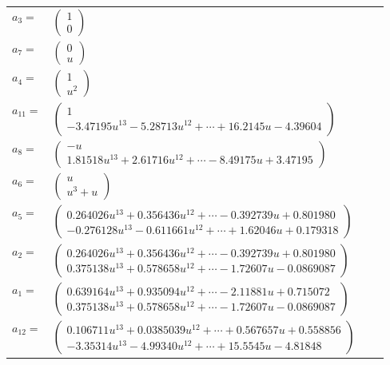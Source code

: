 \documentclass[1p]{elsarticle_modified}
\theoremstyle{definition}
\begin{document}
\begin{tabular}{m{7pt} m{180pt} m{7pt} m{180pt} }
\flushright $a_{3}=$&$\begin{pmatrix}1\\0\end{pmatrix}$ \\
\flushright $a_{7}=$&$\begin{pmatrix}0\\u\end{pmatrix}$ \\
\flushright $a_{4}=$&$\begin{pmatrix}1\\u^2\end{pmatrix}$ \\
\flushright $a_{11}=$&$\begin{pmatrix}1\\-3.47195 u^{13}-5.28713 u^{12}+\cdots+16.2145 u-4.39604\end{pmatrix}$ \\
\flushright $a_{8}=$&$\begin{pmatrix}- u\\1.81518 u^{13}+2.61716 u^{12}+\cdots-8.49175 u+3.47195\end{pmatrix}$ \\
\flushright $a_{6}=$&$\begin{pmatrix}u\\u^3+u\end{pmatrix}$ \\
\flushright $a_{5}=$&$\begin{pmatrix}0.264026 u^{13}+0.356436 u^{12}+\cdots-0.392739 u+0.801980\\-0.276128 u^{13}-0.611661 u^{12}+\cdots+1.62046 u+0.179318\end{pmatrix}$ \\
\flushright $a_{2}=$&$\begin{pmatrix}0.264026 u^{13}+0.356436 u^{12}+\cdots-0.392739 u+0.801980\\0.375138 u^{13}+0.578658 u^{12}+\cdots-1.72607 u-0.0869087\end{pmatrix}$ \\
\flushright $a_{1}=$&$\begin{pmatrix}0.639164 u^{13}+0.935094 u^{12}+\cdots-2.11881 u+0.715072\\0.375138 u^{13}+0.578658 u^{12}+\cdots-1.72607 u-0.0869087\end{pmatrix}$ \\
\flushright $a_{12}=$&$\begin{pmatrix}0.106711 u^{13}+0.0385039 u^{12}+\cdots+0.567657 u+0.558856\\-3.35314 u^{13}-4.99340 u^{12}+\cdots+15.5545 u-4.81848\end{pmatrix}$ \\

\end{tabular}
\end{document}
